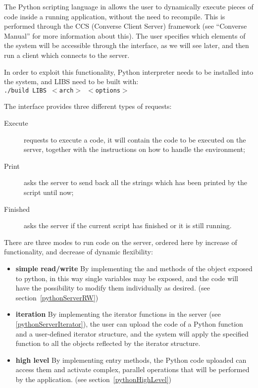 The Python scripting language in \charmpp{} allows the user to dynamically
execute pieces of code inside a running application, without the need to
recompile. This is performed through the CCS (Converse Client Server) framework
(see ``Converse Manual'' for more information about this). The user specifies
which elements of the system will be accessible through the interface, as we
will see later, and then run a client which connects to the server.

In order to exploit this functionality, Python interpreter needs to be installed
into the system, and \charmpp{} LIBS need to be built with:\\
\texttt{./build LIBS $<$arch$>$ $<$options$>$}

The interface provides three different types of requests:

\begin{description}
\item[Execute] requests to execute a code, it will contain the code to be executed on the server, together with the instructions on how to handle the environment;
\item[Print] asks the server to send back all the strings which has been printed by the script until now;
\item[Finished] asks the server if the current script has finished or it is still running.
\end{description}

There are three modes to run code on the server, ordered here by increase of
functionality, and decrease of dynamic flexibility:
\begin{itemize}
\item \textbf{simple read/write} By implementing the  and  methods
of the object exposed to python, in this way single variables may be exposed,
and the code will have the possibility to modify them individually as desired.
(see section~\ref{pythonServerRW})
\item \textbf{iteration} By implementing the iterator functions in the server (see
\ref{pythonServerIterator}), the user can upload the code of a Python function
and a user-defined iterator structure, and the system will apply the specified
function to all the objects reflected by the iterator structure.
\item \textbf{high level} By implementing  entry methods, the Python code uploaded can access them and activate complex, parallel operations that will be performed by the \charmpp{} application. (see section~\ref{pythonHighLevel})
\end{itemize}

